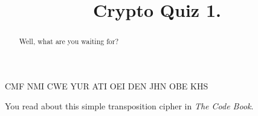 \documentclass[handout]{ximera}
\title{Crypto Quiz 1.}
\begin{document}
\begin{abstract} {Well, what are you waiting for?}
\end{abstract}
\maketitle

\begin{exercise}
CMF NMI CWE YUR ATI OEI DEN JHN OBE KHS 

\begin{hint} You read about this simple transposition cipher in \textit{The Code Book}.
\end{hint}


\end{exercise}
\end{document}
